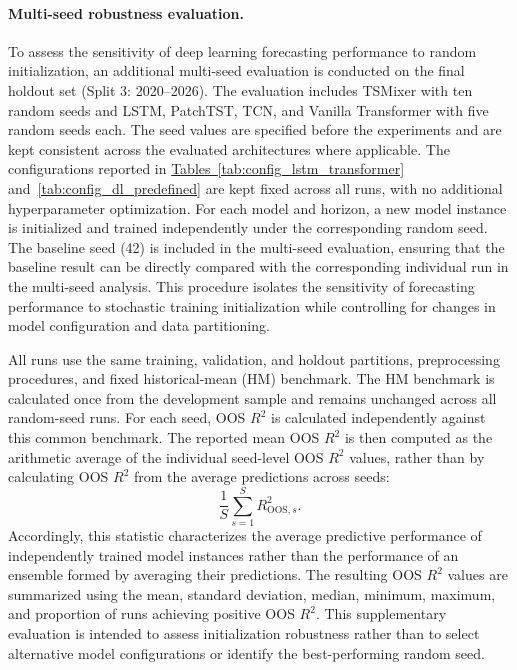 \documentclass[runningheads,orivec]{llncs}
\begin{document}
\paragraph{Multi-seed robustness evaluation.} To assess the sensitivity of deep learning forecasting performance to random initialization, an additional multi-seed evaluation is conducted on the final holdout set (Split 3: 2020--2026). The evaluation includes TSMixer with ten random seeds and LSTM, PatchTST, TCN, and Vanilla Transformer with five random seeds each. The seed values are specified before the experiments and are kept consistent across the evaluated architectures where applicable. The configurations reported in \hyperref[tab:config_lstm_transformer]{Tables~\ref*{tab:config_lstm_transformer}} and~\hyperref[tab:config_dl_predefined]{\ref*{tab:config_dl_predefined}} are kept fixed across all runs, with no additional hyperparameter optimization. For each model and horizon, a new model instance is initialized and trained independently under the corresponding random seed. The baseline seed (42) is included in the multi-seed evaluation, ensuring that the baseline result can be directly compared with the corresponding individual run in the multi-seed analysis. This procedure isolates the sensitivity of forecasting performance to stochastic training initialization while controlling for changes in model configuration and data partitioning.

All runs use the same training, validation, and holdout partitions, preprocessing procedures, and fixed historical-mean (HM) benchmark. The HM benchmark is calculated once from the development sample and remains unchanged across all random-seed runs. For each seed, OOS $R^2$ is calculated independently against this common benchmark. The reported mean OOS $R^2$ is then computed as the arithmetic average of the individual seed-level OOS $R^2$ values, rather than by calculating OOS $R^2$ from the average predictions across seeds:
\[
\frac{1}{S}\sum_{s=1}^{S} R^2_{\mathrm{OOS},s}.
\]
Accordingly, this statistic characterizes the average predictive performance of independently trained model instances rather than the performance of an ensemble formed by averaging their predictions. The resulting OOS $R^2$ values are summarized using the mean, standard deviation, median, minimum, maximum, and proportion of runs achieving positive OOS $R^2$. This supplementary evaluation is intended to assess initialization robustness rather than to select alternative model configurations or identify the best-performing random seed.
\end{document}

